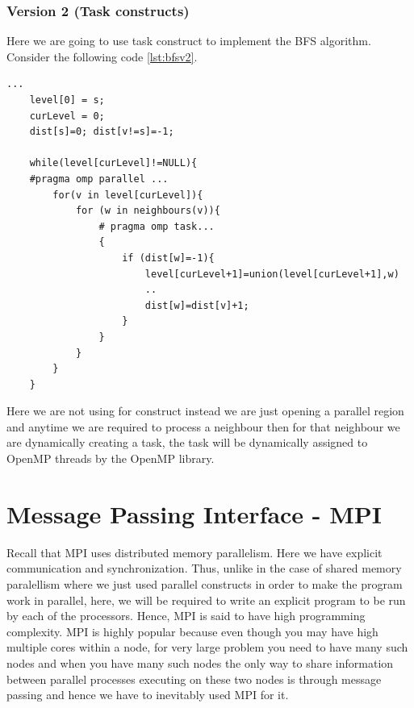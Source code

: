\documentclass[12pt]{article}
\begin{document}
\subsubsection{Version 2 (Task constructs)}
Here we are going to use task construct to implement the BFS algorithm.
Consider the following code \ref{lst:bfsv2}.
\begin{lstlisting}[caption={BFS-Example},captionpos=b,label={lst:bfsv2}]
...
    level[0] = s;
    curLevel = 0;
    dist[s]=0; dist[v!=s]=-1;

    while(level[curLevel]!=NULL){
    #pragma omp parallel ...
        for(v in level[curLevel]){
            for (w in neighbours(v)){
                # pragma omp task...
                {
                    if (dist[w]=-1){
                        level[curLevel+1]=union(level[curLevel+1],w)
                        ..
                        dist[w]=dist[v]+1;
                    }
                }
            }       
        }   
    }
\end{lstlisting}
Here we are not using for construct instead we are just opening a parallel region and anytime we are required to process a neighbour then for that neighbour we are dynamically creating a task, the task will be dynamically assigned to OpenMP threads by the OpenMP library.

\newpage

\section{Message Passing Interface - MPI}
Recall that MPI uses distributed memory parallelism. Here we have explicit communication and synchronization. Thus, unlike in the case of shared memory paralellism where we just used parallel constructs in order to make the program work in parallel, here, we will be required to write an explicit program to be run by each of the processors. Hence, MPI is said to have high programming complexity. MPI is highly popular because even though you may have high multiple cores within a node, for very large problem you need to have many such nodes and when you have many such nodes the only way to share information between parallel processes executing on these two nodes is through message passing and hence we have to inevitably used MPI for it.
\end{document}
